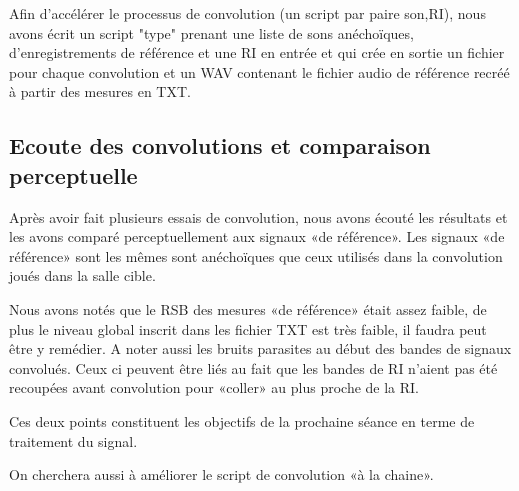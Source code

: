 \documentclass[12pt]{article}
\begin{document}
Afin d'accélérer le processus de convolution (un script par paire {son,RI}), nous avons écrit un script "type" prenant une liste de sons anéchoïques, d'enregistrements de référence et une RI en entrée et qui crée en sortie un fichier pour chaque convolution et un WAV contenant le fichier audio de référence recréé à partir des mesures en TXT.

\subsection{Ecoute des convolutions et comparaison perceptuelle} %

Après avoir fait plusieurs essais de convolution, nous avons écouté les résultats et les avons comparé perceptuellement aux signaux «de référence». Les signaux «de référence» sont les mêmes sont anéchoïques que ceux utilisés dans la convolution joués dans la salle cible.

Nous avons notés que le RSB des mesures «de référence» était assez faible, de plus le niveau global inscrit dans les fichier TXT est très faible, il faudra peut être y remédier. A noter aussi les bruits parasites au début des bandes de signaux convolués. Ceux ci peuvent être liés au fait que les bandes de RI n'aient pas été recoupées avant convolution pour «coller» au plus proche de la RI.

Ces deux points constituent les objectifs de la prochaine séance en terme de traitement du signal.

On cherchera aussi à améliorer le script de convolution «à la chaine».

\end{document}
